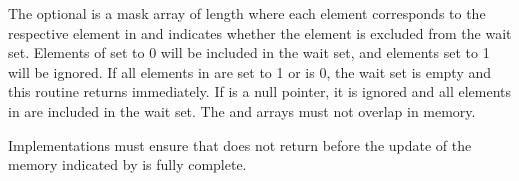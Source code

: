 \begin{apidefinition}
{    The optional  is a mask array of length  where each
    element corresponds to the respective element in  and indicates
    whether the element is excluded from the wait set.  Elements of
     set to 0 will be included in the wait set, and elements set to
    1 will be ignored.  If all elements in  are set to 1 or
     is 0, the wait set is empty and this routine returns
    immediately.  If  is a null pointer, it is ignored and all
    elements in  are included in the wait set.  The  and
     arrays must not overlap in memory.

    Implementations must ensure that 
    does not return before the update of the memory indicated by  is
    fully complete.
}




\end{apidefinition}
